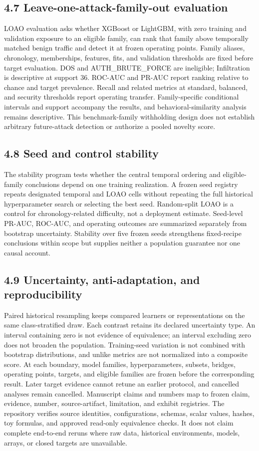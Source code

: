 \documentclass[preprint,12pt]{elsarticle}
\begin{document}
\subsection{4.7 Leave-one-attack-family-out evaluation}
LOAO evaluation asks whether XGBoost or LightGBM, with zero training and validation exposure to an eligible family, can rank that family above temporally matched benign traffic and detect it at frozen operating points. Family aliases, chronology, memberships, features, fits, and validation thresholds are fixed before target evaluation. DOS and AUTH\_BRUTE\_FORCE are ineligible; Infiltration is descriptive at support 36.
ROC-AUC and PR-AUC report ranking relative to chance and target prevalence. Recall and related metrics at standard, balanced, and security thresholds report operating transfer. Family-specific conditional intervals and support accompany the results, and behavioral-similarity analysis remains descriptive. This benchmark-family withholding design does not establish arbitrary future-attack detection or authorize a pooled novelty score.

\subsection{4.8 Seed and control stability}
The stability program tests whether the central temporal ordering and eligible-family conclusions depend on one training realization. A frozen seed registry repeats designated temporal and LOAO cells without repeating the full historical hyperparameter search or selecting the best seed. Random-split LOAO is a control for chronology-related difficulty, not a deployment estimate. Seed-level PR-AUC, ROC-AUC, and operating outcomes are summarized separately from bootstrap uncertainty. Stability over five frozen seeds strengthens fixed-recipe conclusions within scope but supplies neither a population guarantee nor one causal account.

\subsection{4.9 Uncertainty, anti-adaptation, and reproducibility}
Paired historical resampling keeps compared learners or representations on the same class-stratified draw. Each contrast retains its declared uncertainty type. An interval containing zero is not evidence of equivalence; an interval excluding zero does not broaden the population. Training-seed variation is not combined with bootstrap distributions, and unlike metrics are not normalized into a composite score.
At each boundary, model families, hyperparameters, subsets, bridges, operating points, targets, and eligible families are frozen before the corresponding result. Later target evidence cannot retune an earlier protocol, and cancelled analyses remain cancelled. Manuscript claims and numbers map to frozen claim, evidence, number, source-artifact, limitation, and exhibit registries. The repository verifies source identities, configurations, schemas, scalar values, hashes, toy formulas, and approved read-only equivalence checks. It does not claim complete end-to-end reruns where raw data, historical environments, models, arrays, or closed targets are unavailable.
\end{document}
